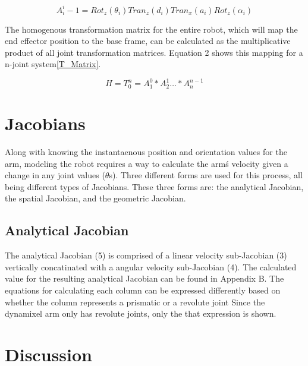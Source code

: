 \documentclass[10pt,journal]{IEEEtran}
\begin{document}
\begin{equation}\label{A_Matrix}
	A_i^i-1=Rot_z(\theta_i)Tran_z(d_i)Tran_x(a_i)Rot_z(\alpha_i)
\end{equation}

The homogenous transformation matrix for the entire robot,
which will map the end effector position to the base frame,
can be calculated as the multiplicative product of all joint
transformation matrices. Equation 2 shows this mapping for
a n-joint system\ref{T_Matrix}.

\begin{equation}\label{T_Matrix}
	H=T_0^n = A_1^0*A_2^1 \dots*A_n^{n-1}
\end{equation}

\section{Jacobians}
Along with knowing the instantaenous position and orientation
values for the arm, modeling the robot requires a way
to calculate the arm\'s velocity given a change in any joint
values ($\theta$s). Three different forms are used for this process,
all being different types of Jacobians. These three forms are:
the analytical Jacobian, the spatial Jacobian, and the geometric
Jacobian.

\subsection{Analytical Jacobian}
The analytical Jacobian (5) is comprised of a linear velocity
sub-Jacobian (3) vertically concatinated with a angular velocity
sub-Jacobian (4). The calculated value for the resulting
analytical Jacobian can be found in Appendix B. The equations
for calculating each column can be expressed differently based
on whether the column represents a prismatic or a revolute
joint Since the dynamixel arm only has revolute joints, only
the that expression is shown.

\section{Discussion}

 
 
\end{document}
